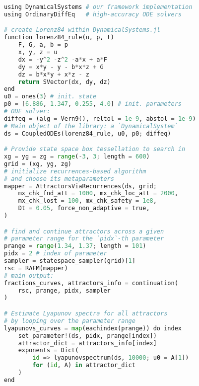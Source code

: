 \documentclass[9pt,twocolumn,twoside,lineno]{pnas-new}
\begin{document}
\begin{lstlisting}[language=Python, label = {lst:code},basicstyle=\footnotesize\ttfamily, caption = {Julia code snippet showcasing the usage of the DynamicalSystems.jl implementation of our framework. The code produces panel (a) of Fig. 2. The main output of the code are two vectors, containing the basins fractions and attractors at each parameter value respectively. The fractions and attractors are formulated as dictionaries, mapping attractor labels (the integers) to basin fractions and sets of points on the attractor, respectively. At its end, the code snippet computes the Lyapunov spectra of all found attractors, by using the first point on each attractor as initial condition for the computation of the Lyapunov spectrum.}]
using DynamicalSystems # our framework implementation
using OrdinaryDiffEq   # high-accuracy ODE solvers

# create Lorenz84 within DynamicalSystems.jl
function lorenz84_rule(u, p, t)
    F, G, a, b = p
    x, y, z = u
    dx = -y^2 -z^2 -a*x + a*F
    dy = x*y - y - b*x*z + G
    dz = b*x*y + x*z - z
    return SVector(dx, dy, dz)
end
u0 = ones(3) # init. state
p0 = [6.886, 1.347, 0.255, 4.0] # init. parameters
# ODE solver:
diffeq = (alg = Vern9(), reltol = 1e-9, abstol = 1e-9)
# Main object of the library: a `DynamicalSystem`
ds = CoupledODEs(lorenz84_rule, u0, p0; diffeq)

# Provide state space box tessellation to search in
xg = yg = zg = range(-3, 3; length = 600)
grid = (xg, yg, zg)
# initialize recurrences-based algorithm
# and choose its metaparameters
mapper = AttractorsViaRecurrences(ds, grid;
    mx_chk_fnd_att = 1000, mx_chk_loc_att = 2000,
    mx_chk_lost = 100, mx_chk_safety = 1e8,
    Dt = 0.05, force_non_adaptive = true,
)

# find and continue attractors across a given
# parameter range for the `pidx`-th parameter
prange = range(1.34, 1.37; length = 101)
pidx = 2 # index of parameter
sampler = statespace_sampler(grid)[1]
rsc = RAFM(mapper)
# main output:
fractions_curves, attractors_info = continuation(
    rsc, prange, pidx, sampler
)

# Estimate Lyapunov spectra for all attractors
# by looping over the parameter range
lyapunovs_curves = map(eachindex(prange)) do index
    set_parameter!(ds, pidx, prange[index])
    attractor_dict = attractors_info[index]
    exponents = Dict(
        id => lyapunovspectrum(ds, 10000; u0 = A[1])
        for (id, A) in attractor_dict
    )
end
\end{lstlisting}




\showacknow{} %

\end{document}
